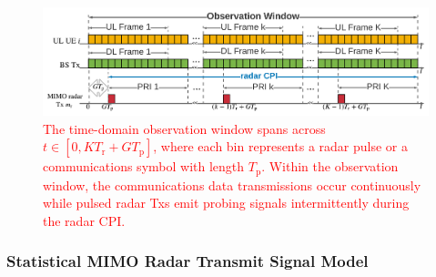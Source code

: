 \documentclass[10pt,journal]{IEEEtran}
\newcommand{\bracket}[1]{{\left [{#1}\right ]}}
\newcommand{\ith}[1]    {{#1}^{\underline{\text{th}}}}
\theoremstyle{definition}
\begin{document}
	\begin{figure}[!t]
		\centering
		\includegraphics[width=1.0\columnwidth]{newFigures/Transmission.png}
		\caption{\textcolor{red}{The time-domain observation window spans across $t\in\bracket{0,KT_{\mathrm{r}}+GT_\mathrm{p}}$, where each bin represents a radar pulse or a communications symbol with length $T_{\mathrm{p}}$. Within the observation window, the communications data transmissions occur continuously while pulsed radar Txs emit probing signals intermittently during the radar CPI.}
		} 
		\label{fig:transmissionmodel}
	\end{figure} %
	\subsubsection{Statistical MIMO Radar Transmit Signal Model}
	
\end{document}
